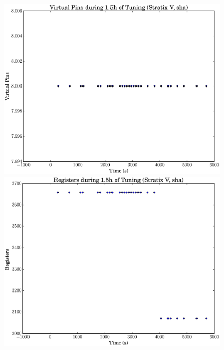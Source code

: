 \documentclass[12pt, a4paper]{article}
\begin{document}
\begin{figure}[htpb]
    \begin{minipage}{.48\textwidth}
        \includegraphics[scale=.25]{sha_pins_5400_chstone_StratixV}
    \end{minipage}%
    \hfill
    \begin{minipage}{.48\textwidth}
        \includegraphics[scale=.25]{sha_regs_5400_chstone_StratixV}
    \end{minipage}%


\end{figure}
\end{document}
